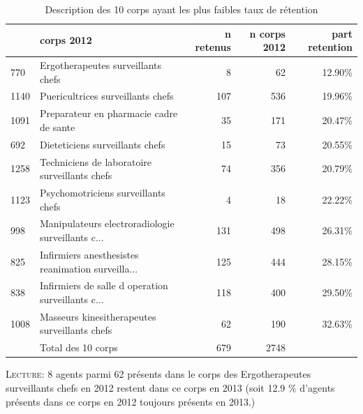 \documentclass[11pt,a4paper]{article}
\begin{document}
\begin{table}[h!]
	\label{means}
	\centering
	\caption{Description des 10 corps ayant les plus faibles taux de rétention} 
\begin{tabular}{llrrr}
	\toprule
	{} &                                     corps 2012 &  n retenus &  n corps 2012 &  part retention \\
\midrule
770  &                 Ergotherapeutes surveillants chefs &                8 &                                           62 &                                             12.90\% \\
1140 &                  Puericultrices surveillants chefs &              107 &                                          536 &                                             19.96\% \\
1091 &            Preparateur en pharmacie cadre de sante &               35 &                                          171 &                                             20.47\% \\
692  &                    Dieteticiens surveillants chefs &               15 &                                           73 &                                             20.55\% \\
1258 &      Techniciens de laboratoire surveillants chefs &               74 &                                          356 &                                             20.79\% \\
1123 &                Psychomotriciens surveillants chefs &                4 &                                           18 &                                             22.22\% \\
998  &  Manipulateurs electroradiologie surveillants c... &              131 &                                          498 &                                             26.31\% \\
825  &  Infirmiers anesthesistes reanimation surveilla... &              125 &                                          444 &                                             28.15\% \\
838  &  Infirmiers de salle d operation surveillants c... &              118 &                                          400 &                                             29.50\% \\
1008 &      Masseurs kinesitherapeutes surveillants chefs &               62 &                                          190 &                                             32.63\% \\
	     & Total des 10 corps & 679 & 2748\\
\bottomrule
\end{tabular}
\begin{minipage}{15cm}
\footnotesize
\textsc{Lecture:} 8 agents parmi 62 présents dans le corps des Ergotherapeutes surveillants chefs en 2012 restent dans ce corps en 2013 (soit 12.9 \% d'agents présents dans ce corps en 2012 toujours présents en 2013.)
\end{minipage}
\end{table}
\end{document}
